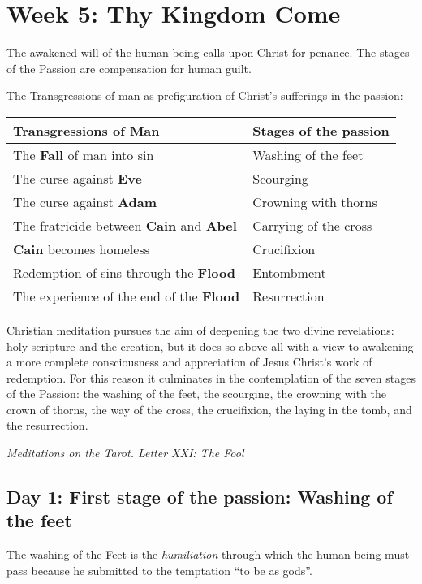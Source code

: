 \section{Week 5: Thy Kingdom Come}

The awakened will of the human being calls upon Christ for penance. The stages of the Passion are compensation for human
guilt.

The Transgressions of man as prefiguration of Christ's sufferings in the passion:

\begin{tabular}{ll}\toprule
\textbf{Transgressions of Man} &
\textbf{Stages of the passion}\\\midrule
The \textbf{Fall} of man into sin &
Washing of the feet\\
The curse against \textbf{Eve} &
Scourging\\
The curse against \textbf{Adam} &
Crowning with thorns\\
The fratricide between \textbf{Cain} and \textbf{Abel} &
Carrying of the cross\\
\textbf{Cain} becomes homeless &
Crucifixion\\
Redemption of sins through the \textbf{Flood} &
Entombment\\
The experience of the end of the \textbf{Flood} &
Resurrection\\\bottomrule
\end{tabular}

\begin{quotationx}
Christian meditation pursues the aim of deepening the two divine revelations: holy scripture and the creation, but it
does so above all with a view to awakening a more complete consciousness and appreciation of Jesus
Christ's work of redemption. For this reason it culminates in the contemplation of the seven
stages of the Passion: the washing of the feet, the scourging, the crowning with the crown of thorns, the way of the
cross, the crucifixion, the laying in the tomb, and the resurrection. \begin{flushright} \emph{Meditations on the Tarot. Letter XXI: The Fool}\end{flushright}

\end{quotationx}

\subsection*{Day 1: First stage of the passion: Washing of the feet}
The washing of the Feet is the \emph{humiliation} through which the human being must pass because he submitted to the
temptation “to be as gods”.

